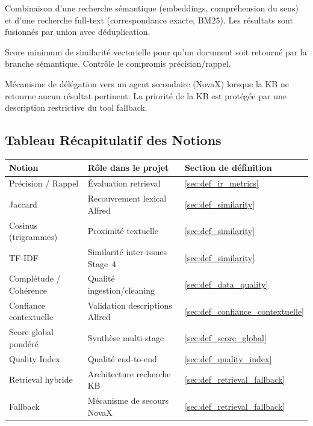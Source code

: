 \begin{description}[leftmargin=3cm, labelwidth=2.8cm]
  \item[Retrieval hybride] Combinaison d'une recherche sémantique (embeddings, compréhension du sens) et d'une recherche full-text (correspondance exacte, BM25). Les résultats sont fusionnés par union avec déduplication.
  \item[Seuil sémantique] Score minimum de similarité vectorielle pour qu'un document soit retourné par la branche sémantique. Contrôle le compromis précision/rappel.
  \item[Fallback] Mécanisme de délégation vers un agent secondaire (NovaX) lorsque la KB ne retourne aucun résultat pertinent. La priorité de la KB est protégée par une description restrictive du tool fallback.
\end{description}

\subsection{Tableau Récapitulatif des Notions}
\label{sec:glossaire_evaluation}

\begin{longtable}{p{3.5cm}p{5cm}p{4.5cm}}
\toprule
\textbf{Notion} & \textbf{Rôle dans le projet} & \textbf{Section de définition} \\
\midrule
Précision / Rappel & Évaluation retrieval & \ref{sec:def_ir_metrics} \\
Jaccard & Recouvrement lexical Alfred & \ref{sec:def_similarity} \\
Cosinus (trigrammes) & Proximité textuelle & \ref{sec:def_similarity} \\
TF-IDF & Similarité inter-issues Stage~4 & \ref{sec:def_similarity} \\
Complétude / Cohérence & Qualité ingestion/cleaning & \ref{sec:def_data_quality} \\
Confiance contextuelle & Validation descriptions Alfred & \ref{sec:def_confiance_contextuelle} \\
Score global pondéré & Synthèse multi-stage & \ref{sec:def_score_global} \\
Quality Index & Qualité end-to-end & \ref{sec:def_quality_index} \\
Retrieval hybride & Architecture recherche KB & \ref{sec:def_retrieval_fallback} \\
Fallback & Mécanisme de secours NovaX & \ref{sec:def_retrieval_fallback} \\
\bottomrule
\end{longtable}

